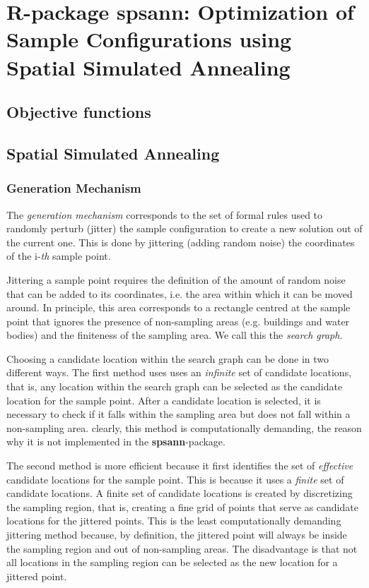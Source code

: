 \artigofalse
\chapter{R-package spsann: Optimization of Sample Configurations using Spatial 
Simulated Annealing}
\label{apen:spsann}

% 

\section{Objective functions}



\section{Spatial Simulated Annealing}

\subsection{Generation Mechanism}

The \textit{generation mechanism} corresponds to the set of formal rules used 
to randomly perturb (jitter) the sample conﬁguration to create a new solution 
out of the current one. This is done by jittering (adding random noise) the 
coordinates of the i-\textit{th} sample point.

Jittering a sample point requires the definition of the amount of random noise
that can be added to its coordinates, i.e. the area within which it can be 
moved around. In principle, this area corresponds to a rectangle centred at the 
sample point that ignores the presence of non-sampling areas (e.g. buildings 
and water bodies) and the finiteness of the sampling area. We call this the 
\textit{search graph}.

Choosing a candidate location within the search graph can be done in two 
different ways. The first method uses uses an \textit{infinite} set of candidate 
locations, that is, any location within the search graph can be selected as the 
candidate location for the sample point. After a candidate location is selected, 
it is necessary to check if it falls within the sampling area but does not fall
within a non-sampling area. clearly, this method is computationally demanding,
the reason why it is not implemented in the \textbf{spsann}-package.

The second method is more efficient because it first identifies the set of 
\textit{effective} candidate locations for the sample point. This is because it
uses a \textit{finite} set of candidate locations. A finite set of candidate 
locations is created by discretizing the sampling region, that is, creating a 
fine grid of points that serve as candidate locations for the jittered points. 
This is the least computationally demanding jittering method because, by 
definition, the jittered point will always be inside the sampling region and out 
of non-sampling areas. The disadvantage is that not all locations in the 
sampling region can be selected as the new location for a jittered point.


